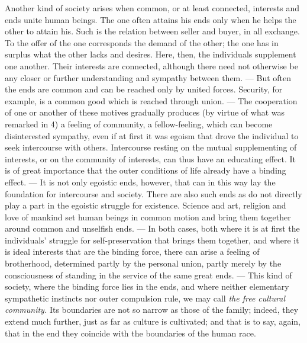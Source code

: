 \documentclass[12pt,a4paper,openany]{book}
\newcommand{\opage}[1]{\marginnote{\footnotesize\textit{[#1]}}}
\begin{document}
Another kind of society arises when common, or at least connected, interests and ends unite human beings. The one often
attains his ends only when he helps the other to attain his. Such is the relation between seller and buyer, in all
exchange. To the offer of the one corresponds the demand of the other; the one has in surplus what the other lacks and
desires. Here, then, the individuals supplement one another. Their interests are connected, although there need not
otherwise be any closer or further understanding and sympathy between them. --- But often the ends are common and can
be reached only by united forces. Security, for example, is a common good which is reached through union. --- The
cooperation of one or another of these motives gradually produces (by virtue of what was remarked in 4) a feeling of
community, a fellow-feeling, which can become disinterested sympathy, even if at first it was egoism that drove the
individual to seek intercourse with others. Intercourse resting on the mutual supplementing of interests, or on the
community of interests, can thus have an educating effect. It is of great importance that the outer conditions of life
already have a binding effect. --- It is not only egoistic ends, however, that can in this way lay the foundation for
intercourse and society. There are also such ends as do not directly play a part in the egoistic struggle for
existence. Science and art, religion and love of mankind set human beings in common motion and bring them together
around common and unselfish ends. --- In both cases, both where it is at first the individuals' struggle for
self-preservation that brings them
\opage{276}together, and where it is ideal interests that are the binding force, there can arise a feeling of
brotherhood, determined partly by the personal union, partly merely by the consciousness of standing in the service of
the same great ends. --- This kind of society, where the binding force lies in the ends, and where neither elementary
sympathetic instincts nor outer compulsion rule, we may call \textit{the free cultural community.} Its boundaries are
not so narrow as those of the family; indeed, they extend much further, just as far as culture is cultivated; and that
is to say, again, that in the end they coincide with the boundaries of the human race.
\end{document}

